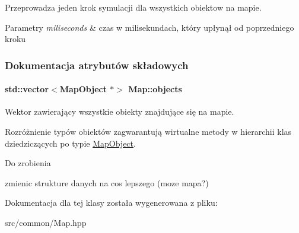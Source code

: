 Przeprowadza jeden krok symulacji dla wszystkich obiektow na mapie. 


\begin{DoxyParams}{Parametry}
{\em miliseconds} & czas w milisekundach, który upłynął od poprzedniego kroku \\
\hline
\end{DoxyParams}


\subsubsection{Dokumentacja atrybutów składowych}
\hypertarget{classMap_a77f2877faf3096da591f2e2d17d92a25}{
\paragraph[{objects}]{\setlength{\rightskip}{0pt plus 5cm}std\-::vector$<${\bf Map\-Object} $\ast$$>$ Map\-::objects\hspace{0.3cm}{\ttfamily [protected]}}}\label{classMap_a77f2877faf3096da591f2e2d17d92a25}


Wektor zawierający wszystkie obiekty znajdujące się na mapie. 

Rozróżnienie typów obiektów zagwarantują wirtualne metody w hierarchii klas dziedziczących po typie \hyperlink{classMapObject}{Map\-Object}.

\begin{DoxyRefDesc}{Do zrobienia}
\item[\hyperlink{todo__todo000009}{Do zrobienia}]zmienic strukture danych na cos lepszego (moze mapa?) \end{DoxyRefDesc}


Dokumentacja dla tej klasy została wygenerowana z pliku\-:\begin{DoxyCompactItemize}
\item 
src/common/Map.\-hpp\end{DoxyCompactItemize}
